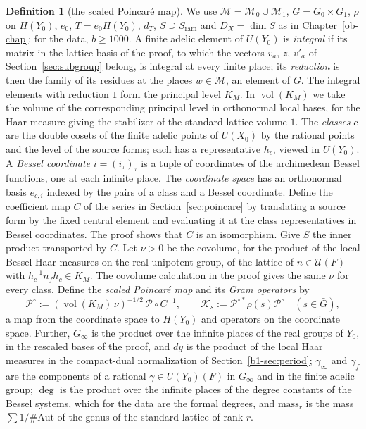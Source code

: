 \documentclass[reqno]{amsart}
\newcounter{chap}
\theoremstyle{definition}
\newtheorem{definition}{Definition}[section]
\theoremstyle{plain}
\theoremstyle{remark}
\newcommand{\Uc}{{\mathcal{U}}}
\newcommand{\Kc}{\mathcal K}
\newcommand{\Pc}{\mathcal P}
\newcommand{\cMc}{\mathcal M}
\newcommand{\Gb}{\bar G}
\newcommand{\vol}{\operatorname{vol}}
\newcommand{\Sr}{S_{\mathrm{ram}}}
\begin{document}
\begin{definition}[the scaled Poincar\'e map]\label{def:scaled}
We use \(\cMc=\cMc_0\cup\cMc_1\), \(\Gb=\Gb_0\times\Gb_1\), \(\rho\) on \(H(Y_0)\), \(e_0\), \(T=e_0H(Y_0)\), \(d_T\), \(S\supseteq\Sr\) and \(D_X=\dim S\) as in Chapter~\ref{ob-chap}; for the data, \(b\ge1000\).  A finite adelic element of \(U(Y_0)\) is \emph{integral} if its matrix in the lattice basis of the proof, to which the vectors \(v_a\), \(z\), \(v'_a\) of Section~\ref{sec:subgroup} belong, is integral at every finite place; its \emph{reduction} is then the family of its residues at the places \(w\in\cMc\), an element of \(\Gb\).  The integral elements with reduction \(1\) form the principal level \(K_M\).  In \(\vol(K_M)\) we take the volume of the corresponding principal level in orthonormal local bases, for the Haar measure giving the stabilizer of the standard lattice volume \(1\).  The \emph{classes} \(c\) are the double cosets of the finite adelic points of \(U(X_0)\) by the rational points and the level of the source forms; each has a representative \(h_c\), viewed in \(U(Y_0)\).  A \emph{Bessel coordinate} \(i=(i_\tau)_\tau\) is a tuple of coordinates of the archimedean Bessel functions, one at each infinite place.  The \emph{coordinate space} has an orthonormal basis \(e_{c,i}\) indexed by the pairs of a class and a Bessel coordinate.  Define the coefficient map \(C\) of the series in Section~\ref{sec:poincare} by translating a source form by the fixed central element and evaluating it at the class representatives in Bessel coordinates.  The proof shows that \(C\) is an isomorphism.  Give \(S\) the inner product transported by \(C\).  Let \(\nu>0\) be the covolume, for the product of the local Bessel Haar measures on the real unipotent group, of the lattice of \(n\in\Uc(F)\) with \(h_c^{-1}n_fh_c\in K_M\).  The covolume calculation in the proof gives the same \(\nu\) for every class.  Define the \emph{scaled Poincar\'e map} and its \emph{Gram operators} by
\[
 \Pc^\circ:=(\vol(K_M)\,\nu)^{-1/2}\,\Pc\circ C^{-1},\qquad \Kc_s:=\Pc^{\circ*}\rho(s)\Pc^\circ\quad(s\in\Gb),
\]
a map from the coordinate space to \(H(Y_0)\) and operators on the coordinate space.  Further, \(G_\infty\) is the product over the infinite places of the real groups of \(Y_0\), in the rescaled bases of the proof, and \(dy\) is the product of the local Haar measures in the compact-dual normalization of Section~\ref{b1-sec:period}; \(\gamma_\infty\) and \(\gamma_f\) are the components of a rational \(\gamma\in U(Y_0)(F)\) in \(G_\infty\) and in the finite adelic group; \(\deg\) is the product over the infinite places of the degree constants of the Bessel systems, which for the data are the formal degrees, and \(\mathrm{mass}_r\) is the mass \(\sum1/\#\mathrm{Aut}\) of the genus of the standard lattice of rank \(r\).
\end{definition}
\end{document}
